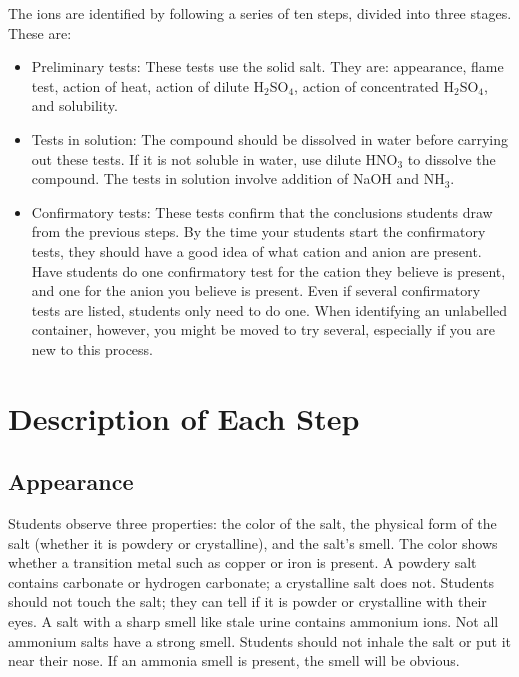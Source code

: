 The ions are identified by following a series of ten steps, 
divided into three stages. 
These are:
\begin{itemize}
\item{Preliminary tests:
These tests use the solid salt. 
They are: appearance, 
flame test, 
action of heat, 
action of dilute H$_{2}$SO$_{4}$, 
action of concentrated H$_{2}$SO$_{4}$, 
and solubility.}
\item{Tests in solution:
The compound should be dissolved in water before carrying out these tests. 
If it is not soluble in water, 
use dilute HNO$_{3}$ to dissolve the compound. 
The tests in solution involve addition of NaOH and NH$_{3}$.}
\item{Confirmatory tests:
These tests confirm that the conclusions students draw from the previous steps. 
By the time your students start the confirmatory tests, 
they should have a good idea of what cation and anion are present. 
Have students do one confirmatory test for the cation they believe is present, 
and one for the anion you believe is present. 
Even if several confirmatory tests are listed, 
students only need to do one. 
When identifying an unlabelled container, 
however, 
you might be moved to try several, 
especially if you are new to this process.}
\end{itemize}

\section{Description of Each Step}
\subsection{Appearance}
Students observe three properties: the color of the salt, 
the physical form of the salt (whether it is powdery or crystalline), 
and the salt’s smell. 
The color shows whether a transition metal such as copper 
or iron is present. 
A powdery salt contains carbonate or hydrogen carbonate; 
a crystalline salt does not. 
Students should not touch the salt; 
they can tell if it is powder or crystalline with their eyes. 
A salt with a sharp smell like stale urine contains ammonium ions. 
Not all ammonium salts have a strong smell. 
Students should not inhale the salt or put it near their nose. 
If an ammonia smell is present, 
the smell will be obvious.


